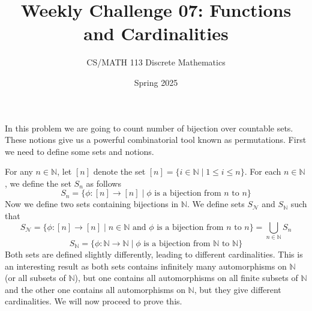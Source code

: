 \documentclass[a4paper]{exam}
\title{Weekly Challenge 07: Functions and Cardinalities}
\author{CS/MATH 113 Discrete Mathematics}
\date{Spring 2025}
\begin{document}
\maketitle



\begin{questions}
    In this problem we are going to count number of bijection over countable sets. These notions give us a powerful combinatorial tool known as permutations. First we need to define some sets and notions. 

    For any $n\in \mathbb{N}$, let $[n]$ denote the set $[n] = \{i\in \mathbb{N}\mid 1 \leq i \leq n\}$. For each $n\in \mathbb{N}$, we define the set $S_n$ as follows
    $$S_n = \{\phi: [n] \to [n] \mid \phi \text{ is a bijection from } n \text{ to } n\}$$
    Now we define two sets containing bijections in $\mathbb{N}$. 
    We define sets $S_{\mathcal{N}}$ and $S_{\mathbb{N}}$ such that 
    $$S_{\mathcal{N}} = \{\phi: [n] \to [n] \mid n \in \mathbb{N} \text{ and }\phi \text{ is a bijection from } n \text{ to } n\} = \bigcup\limits_{n\in \mathbb{N}} S_n$$
    $$S_{\mathbb{N}} = \{\phi: \mathbb{N} \to \mathbb{N} \mid \phi \text{ is a bijection from } \mathbb{N} \text{ to } \mathbb{N}\}$$
    Both sets are defined slightly differently, leading to different cardinalities. This is an interesting result as both sets contains infinitely many automorphisms on $\mathbb{N}$ (or all subsets of $\mathbb{N}$), but one contains all automorphisms on all finite subsets of $\mathbb{N}$ and the other one contains all automorphisms on $\mathbb{N}$, but they give different cardinalities. We will now proceed to prove this.
\end{questions}
\end{document}
